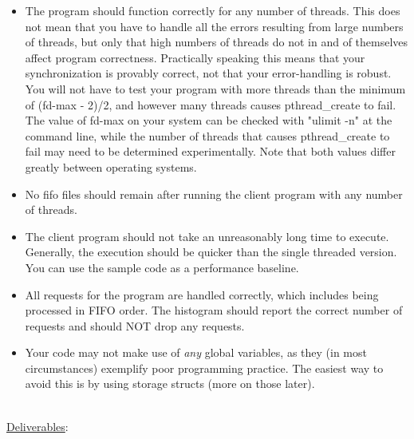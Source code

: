 \documentclass[12pt]{extarticle}
\newenvironment{myindentpar}[1]%
 {\begin{list}{}%
         {\setlength{\leftmargin}{#1}}%
         \item[]%
 }
 {\end{list}}
\begin{document}
\begin{myindentpar}{5mm}
\begin{itemize}
	    \item The program should function correctly for any number of threads. This does not mean that you have to handle all the errors resulting from large numbers of threads, but only that high numbers of threads do not in and of themselves affect program correctness. Practically speaking this means that your synchronization is provably correct, not that your error-handling is robust. You will not have to test your program with more threads than the minimum of (fd-max - 2)/2, and however many threads causes pthread\_create to fail. The value of fd-max on your system can be checked with "ulimit -n" at the command line, while the number of threads that causes pthread\_create to fail may need to be determined experimentally. Note that both values differ greatly between operating systems.
	    \item No fifo files should remain after running the client program with any number of threads.  
	    \item The client program should not take an unreasonably long time to execute.  Generally, the execution should be quicker than the single threaded version.  You can use the sample code as a performance baseline.  
	    \item All requests for the program are handled correctly, which includes being processed in FIFO order.  The histogram should report the correct number of requests and should NOT drop any requests.  
	    \item Your code may not make use of \emph{any} global variables, as they (in most circumstances) exemplify poor programming practice. The easiest way to avoid this is by using storage structs (more on those later).
	    
	\end{itemize}

\end{myindentpar}

\ \\
{\large \underline{Deliverables}:}
\end{document}
